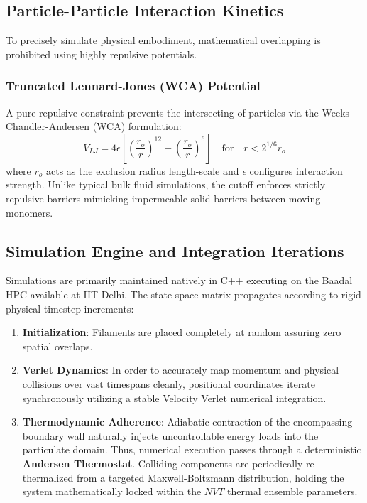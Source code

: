 \documentclass[12pt]{article}
\begin{document}
\newpage

\subsection{Particle-Particle Interaction Kinetics}
To precisely simulate physical embodiment, mathematical overlapping is prohibited using highly repulsive potentials.

\subsubsection{Truncated Lennard-Jones (WCA) Potential}
A pure repulsive constraint prevents the intersecting of particles via the Weeks-Chandler-Andersen (WCA) formulation:
\begin{equation}
V_{LJ} = 4\epsilon \left[ \left(\frac{r_o}{r}\right)^{12} - \left(\frac{r_o}{r}\right)^{6} \right] \quad \text{for} \quad r < 2^{1/6}r_o
\end{equation}
where $r_o$ acts as the exclusion radius length-scale and $\epsilon$ configures interaction strength. Unlike typical bulk fluid simulations, the cutoff enforces strictly repulsive barriers mimicking impermeable solid barriers between moving monomers.

\subsection{Simulation Engine and Integration Iterations}
Simulations are primarily maintained natively in C++ executing on the Baadal HPC available at IIT Delhi. The state-space matrix propagates according to rigid physical timestep increments:
\begin{enumerate}
    \item \textbf{Initialization}: Filaments are placed completely at random assuring zero spatial overlaps.
    \item \textbf{Verlet Dynamics}: In order to accurately map momentum and physical collisions over vast timespans cleanly, positional coordinates iterate synchronously utilizing a stable Velocity Verlet numerical integration. 
    \item \textbf{Thermodynamic Adherence}: Adiabatic contraction of the encompassing boundary wall naturally injects uncontrollable energy loads into the particulate domain. Thus, numerical execution passes through a deterministic \textbf{Andersen Thermostat}. Colliding components are periodically re-thermalized from a targeted Maxwell-Boltzmann distribution, holding the system mathematically locked within the $NVT$ thermal ensemble parameters.
\end{enumerate}
\end{document}

